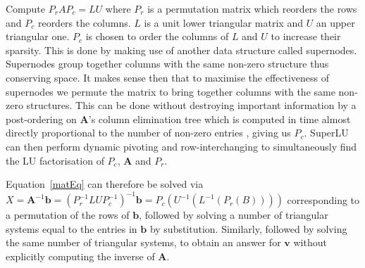 \documentclass[a4paper]{article}
\newcommand{\mat}[1]{\mathbf{#1}}
\newcommand{\vect}[1]{\bm{#1}}
\begin{document}
Compute $P_rAP_c = LU$ where $P_r$ is a permutation matrix which reorders the 
rows and $P_c$ reorders the columns. $L$ is a unit lower triangular matrix and
$U$ an upper triangular one.
$P_c$ is chosen to order the columns of $L$ and $U$ to increase their sparsity. 
This is done by making use of another data structure called supernodes. 
Supernodes group together columns with the same non-zero structure thus 
conserving space. It makes sense then that to maximise the effectiveness of 
supernodes we permute the matrix to bring together columns with the same 
non-zero structures. This can be done without destroying important 
information by a post-ordering on $\mat{A}$'s column elimination tree \cite{ref27}
which is computed in time almost directly proportional to the number of
non-zero entries \cite{ref35}, giving us $P_c$. SuperLU can then perform
dynamic pivoting and row-interchanging to simultaneously find the LU
factorisation of $P_c$, $\mat{A}$ and $P_r$.

Equation~\eqref{matEq} can therefore be solved via
$X = \mat{A}^{-1}\vect{b}= (P_r^{-1}LUP_c^{-1})^{-1}\vect{b} =
P_c(U^{-1}(L^{-1}(P_r(B))))$
corresponding to a permutation of the rows of $\vect{b}$, followed by solving a
number of triangular systems equal to the entries in $\vect{b}$ by substitution.
Similarly, followed by solving the same number of triangular systems, to obtain
an answer for $\vect{v}$ without explicitly computing the inverse of $\mat{A}$.
\end{document}
